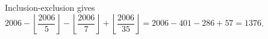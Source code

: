 Inclusion-exclusion gives $2006-\left\lfloor\dfrac{2006}{5}\right\rfloor-\left\lfloor\dfrac{2006}{7}\right\rfloor+\left\lfloor\dfrac{2006}{35}\right\rfloor=2006-401-286+57=\boxed{1376}$.
